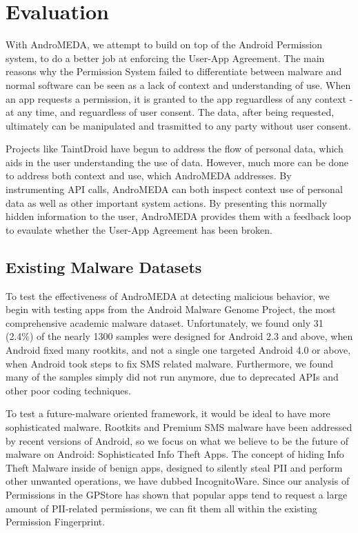 \chapter{Evaluation}
\label{sec:framework}

With AndroMEDA, we attempt to build on top of the Android Permission system, to do a better job at enforcing the User-App Agreement. The main reasons why the Permission System failed to differentiate between malware and normal software can be seen as a lack of context and understanding of use. When an app requests a permission, it is granted to the app reguardless of any context - at any time, and reguardless of user consent. The data, after being requested, ultimately can be manipulated and trasmitted to any party without user consent. 

Projects like TaintDroid\citep{enck2010taintdroid} have begun to address the flow of personal data, which aids in the user understanding the use of data. However, much more can be done to address both context and use, which AndroMEDA addresses. By instrumenting API calls, AndroMEDA can both inspect context use of personal data as well as other important system actions. By presenting this normally hidden information to the user, AndroMEDA provides them with a feedback loop to evaulate whether the User-App Agreement has been broken.

\section{Existing Malware Datasets}
To test the effectiveness of AndroMEDA at detecting malicious behavior, we begin with testing apps from the Android Malware Genome Project\citep{zhou2012dissecting}, the most comprehensive academic malware dataset. Unfortunately, we found only 31 (2.4\%) of the nearly 1300 samples were designed for Android 2.3 and above, when Android fixed many rootkits, and not a single one targeted Android 4.0 or above, when Android took steps to fix SMS related malware. Furthermore, we found many of the samples simply did not run anymore, due to deprecated APIs and other poor coding techniques.


To test a future-malware oriented framework, it would be ideal to have more sophisticated malware. Rootkits and Premium SMS malware have been addressed by recent versions of Android, so we focus on what we believe to be the future of malware on Android: Sophisticated Info Theft Apps. The concept of hiding Info Theft Malware inside of benign apps, designed to silently steal PII and perform other unwanted operations, we have dubbed IncognitoWare. Since our analysis of Permissions in the GPStore has shown that popular apps tend to request a large amount of PII-related permissions, we can fit them all within the existing Permission Fingerprint. 

